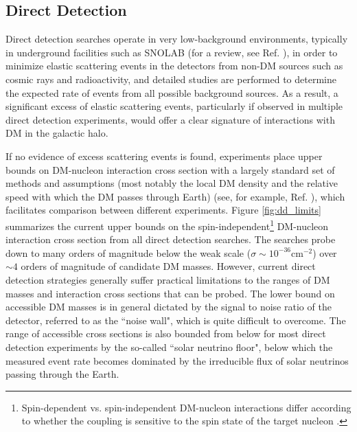 \subsection{Direct Detection}

Direct detection searches operate in very low-background environments, typically in underground facilities such as SNOLAB (for a review, see Ref. \cite{Lawson_2013}), in order to minimize elastic scattering events in the detectors from non-DM sources such as cosmic rays and radioactivity, and detailed studies are performed to determine the expected rate of events from all possible background sources. As a result, a significant excess of elastic scattering events, particularly if observed in multiple direct detection experiments, would offer a clear signature of interactions with DM in the galactic halo. 

If no evidence of excess scattering events is found, experiments place upper bounds on DM-nucleon interaction cross section with a largely standard set of methods and assumptions (most notably the local DM density and the relative speed with which the DM passes through Earth) (see, for example, Ref. \cite{dd_results_standards_2021}), which facilitates comparison between different experiments. Figure \ref{fig:dd_limits} summarizes the current upper bounds on the spin-independent\footnote{Spin-dependent vs. spin-independent DM-nucleon interactions differ according to whether the coupling is sensitive to the spin state of the target nucleon \cite{billard2021direct}.} DM-nucleon interaction cross section from all direct detection searches. The searches probe down to many orders of magnitude below the weak scale (\(\sigma\sim10^{-36}\)cm\(^{-2}\)) over \(\sim4\) orders of magnitude of candidate DM masses. However, current direct detection strategies generally suffer practical limitations to the ranges of DM masses and interaction cross sections that can be probed. The lower bound on accessible DM masses is in general dictated by the signal to noise ratio of the detector, referred to as the ``noise wall", which is quite difficult to overcome. The range of accessible cross sections is also bounded from below for most direct detection experiments by the so-called ``solar neutrino floor", below which the measured event rate becomes dominated by the irreducible flux of solar neutrinos passing through the Earth. 

